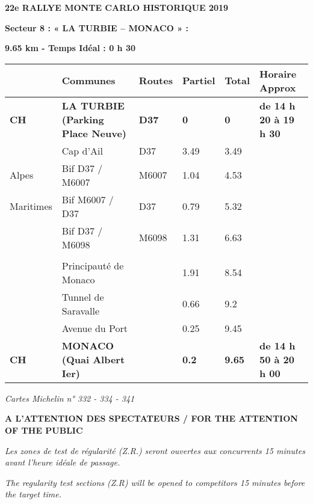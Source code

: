 \documentclass{article}%
\begin{document}
%
\normalsize%
\begin{center} \textbf{\LARGE{22e RALLYE MONTE CARLO HISTORIQUE 2019}} \end{center}%
\begin{flushleft} \textbf{Secteur 8 : « LA TURBIE – MONACO » :
} \end{flushleft}%
\begin{flushright} \textbf{            } \end{flushright}%
\begin{flushright} \textbf{9.65 km - Temps Idéal : 0 h 30} \end{flushright}%
\begin{longtable}{p{2.25cm}|p{7.0cm}|p{1.5cm}|p{1.5cm}|p{1.5cm}|p{3.5cm}}%
\hline%
&Communes&Routes&Partiel&Total&Horaire Approx\\%
\hline%
\endhead%
\endfoot%
\endlastfoot%
\textbf{﻿CH}&\textbf{LA TURBIE (Parking Place Neuve)}&\textbf{D37}&\textbf{0}&\textbf{0}&\textbf{de 14 h 20 à 19 h 30}\\%
 &Cap d’Ail&D37&3.49&3.49& \\%
Alpes&Bif D37 / M6007&M6007&1.04&4.53& \\%
Maritimes&Bif M6007 / D37&D37&0.79&5.32& \\%
 &Bif D37 / M6098&M6098&1.31&6.63& \\%
\hline& & & & & \\%
 &Principauté de Monaco& &1.91&8.54& \\%
 &Tunnel de Saravalle& &0.66&9.2& \\%
 &Avenue du Port& &0.25&9.45& \\%
\textbf{CH}&\textbf{MONACO (Quai Albert Ier)}& &\textbf{0.2}&\textbf{9.65}&\textbf{de 14 h 50 à 20 h 00}\\%
\hline%
\end{longtable}%
\begin{flushleft} \textit{Cartes Michelin n° 332 - 334 - 341
} \end{flushleft}%
\begin{center} \textbf{A L’ATTENTION DES SPECTATEURS / FOR THE ATTENTION OF THE PUBLIC 							
} \end{center}%
\begin{center} \textit{Les zones de test de régularité (Z.R.) seront ouvertes aux concurrents 15 minutes avant l’heure idéale de passage.							
} \end{center}%
\begin{center} \textit{The regularity test sections (Z.R) will be opened to competitors 15 minutes before the target time.							
} \end{center}%
\end{document}
